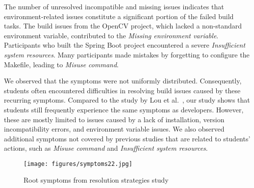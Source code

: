 \documentclass[10pt, conference]{IEEEtran}
\begin{document}
The number of unresolved incompatible and missing issues indicates that environment-related issues constitute a significant portion of the failed build tasks. The build issues from the OpenCV project, which lacked a non-standard environment variable, contributed to the \textit{Missing environment variable}. Participants who built the Spring Boot project encountered a severe \textit{Insufficient system resources}. Many participants made mistakes by forgetting to configure the Makefile, leading to \textit{Misuse command}. 

We observed that the symptoms were not uniformly distributed. Consequently, students often encountered difficulties in resolving build issues caused by these recurring symptoms. Compared to the study by Lou et al.~\cite{lou2020understanding}, our study shows that students still frequently experience the same symptoms as developers. However, these are mostly limited to issues caused by a lack of installation, version incompatibility errors, and environment variable issues. We also observed additional symptoms not covered by previous studies that are related to students’ actions, such as \textit{Misuse command} and \textit{Insufficient system resources}.

\begin{figure}[tbp]
\centerline{
\texttt{[image: figures/symptoms22.jpg]}
}
\vspace{-.2cm}
\caption{Root symptoms from resolution strategies study}
\vspace{-.4cm}
\label{fig:symptoms22}
\end{figure}
\end{document}
